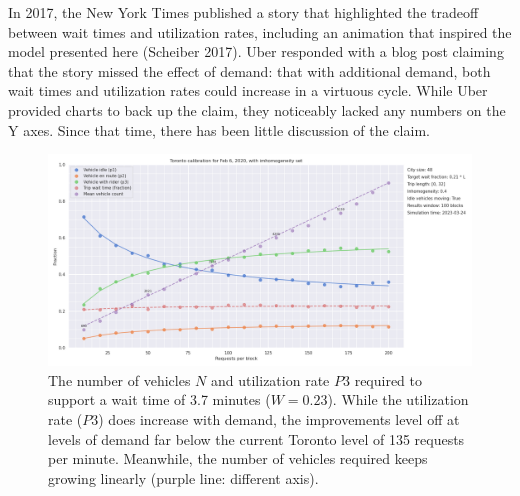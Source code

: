 \documentclass[
  letterpaper,
  DIV=11,
  numbers=noendperiod]{scrartcl}
\begin{document}
In 2017, the New York Times published a story that highlighted the
tradeoff between wait times and utilization rates, including an
animation that inspired the model presented here (Scheiber 2017). Uber
responded with a blog post claiming that the story missed the effect of
demand: that with additional demand, both wait times and utilization
rates could increase in a virtuous cycle. While Uber provided charts to
back up the claim, they noticeably lacked any numbers on the Y axes.
Since that time, there has been little discussion of the claim.

\begin{figure}

{\centering \includegraphics[width=1\textwidth,height=\textheight]{wait_times.png}

}

\caption{\label{fig-fixed-wait-time}The number of vehicles \(N\) and
utilization rate \(P3\) required to support a wait time of 3.7 minutes
(\(W =0.23\)). While the utilization rate (\(P3\)) does increase with
demand, the improvements level off at levels of demand far below the
current Toronto level of 135 requests per minute. Meanwhile, the number
of vehicles required keeps growing linearly (purple line: different
axis).}

\end{figure}
\end{document}
